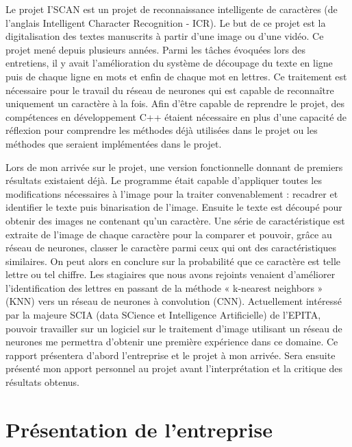 \documentclass[12pt,a4paper]{article}
\begin{document}
Le projet I’SCAN est un projet de reconnaissance intelligente de caractères (de l’anglais Intelligent Character Recognition - ICR). Le but de ce projet est la digitalisation des textes manuscrits à partir d’une image ou d’une vidéo. Ce projet mené depuis plusieurs années. Parmi les tâches évoquées lors des entretiens, il y avait l’amélioration du système de découpage du texte en ligne puis de chaque ligne en mots et enfin de chaque mot en lettres. Ce traitement est nécessaire pour le travail du réseau de neurones qui est capable de reconnaître uniquement un caractère à la fois. Afin d’être capable de reprendre le projet, des compétences en développement C++ étaient nécessaire en plus d’une capacité de réflexion pour comprendre les méthodes déjà utilisées dans le projet ou les méthodes que seraient implémentées dans le projet.\bigbreak
\bigbreak

Lors de mon arrivée sur le projet, une version fonctionnelle donnant de premiers résultats existaient déjà. Le programme était capable d’appliquer toutes les modifications nécessaires à l’image pour la traiter convenablement : recadrer et identifier le texte puis binarisation de l’image. Ensuite le texte est découpé pour obtenir des images ne contenant qu'un caractère. Une série de caractéristique est extraite de l’image de chaque caractère pour la comparer et pouvoir, grâce au réseau de neurones, classer le caractère parmi ceux qui ont des caractéristiques similaires. On peut alors en conclure sur la probabilité que ce caractère est telle lettre ou tel chiffre.\bigbreak
Les stagiaires que nous avons rejoints venaient d’améliorer l’identification des lettres en passant de la méthode « k-nearest neighbors » (KNN) vers un réseau de neurones à convolution (CNN). \bigbreak
Actuellement intéressé par la majeure SCIA (data SCience et Intelligence Artificielle) de l’EPITA, pouvoir travailler sur un logiciel sur le traitement d’image utilisant un réseau de neurones me permettra d’obtenir une première expérience dans ce domaine.\bigbreak
Ce rapport présentera d’abord l’entreprise et le projet à mon arrivée. Sera ensuite présenté mon apport personnel au projet avant l’interprétation et la critique des résultats obtenus.

\newpage

\section{Présentation de l'entreprise}
\end{document}
